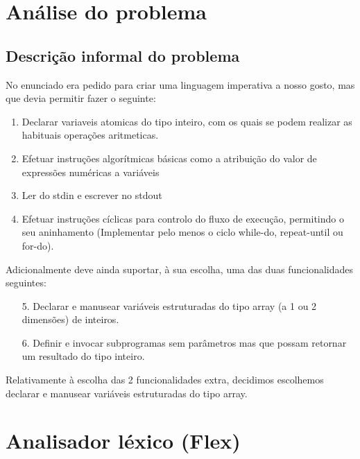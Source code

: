 \documentclass[11pt,a4paper]{report}%
\begin{document}
\chapter{Análise do problema} \label{chap:analiseEspecificacao} %
\section{Descrição informal do problema} \label{sec:descricaoProblema} %

No enunciado era pedido para criar uma linguagem imperativa a nosso gosto, mas que devia
permitir fazer o seguinte:

\begin{enumerate}
\item Declarar variaveis atomicas do tipo inteiro, com os quais se podem realizar as habituais operações aritmeticas.

\item Efetuar instruções algorítmicas básicas como a atribuição do valor de expressões numéricas a variáveis

\item Ler do stdin e escrever no stdout

\item Efetuar instruções cíclicas para controlo do fluxo de execução, permitindo o seu aninhamento (Implementar pelo menos o ciclo while-do, repeat-until ou for-do).
\end{enumerate}

Adicionalmente deve ainda suportar, à sua escolha, uma das duas funcionalidades seguintes:

\begin{enumerate}
\item [5.] Declarar e manusear variáveis estruturadas do tipo array (a 1 ou 2 dimensões) de inteiros.
\item [6.] Definir e invocar subprogramas sem parâmetros mas que possam retornar um resultado do tipo inteiro.
\end{enumerate}

Relativamente à escolha das 2 funcionalidades extra, decidimos escolhemos declarar e manusear variáveis estruturadas do tipo array.

\newpage

\chapter{Analisador léxico (Flex)}
\end{document}
